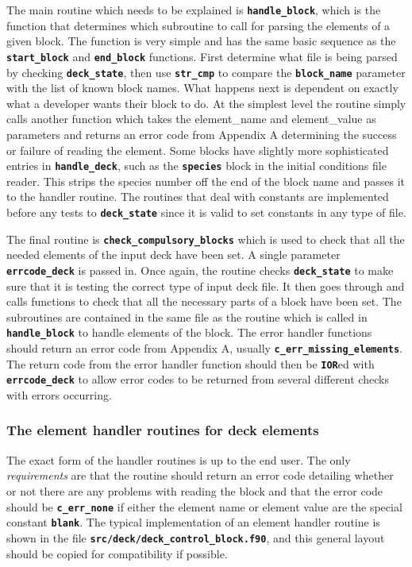 \documentclass[12pt,a4paper]{article}
\newcommand{\inlinecode}[1]{{\color{warwickred} \bf\texttt{#1}}}
\begin{document}
The main routine which needs to be explained is \inlinecode{handle\_block},
which is the function that determines which subroutine to call for parsing the
elements of a given block. The function is very simple and has the same basic
sequence as the \inlinecode{start\_block} and \inlinecode{end\_block}
functions. First determine what file is being parsed by checking
\inlinecode{deck\_state}, then use \inlinecode{str\_cmp} to compare the
\inlinecode{block\_name} parameter with the list of known block names. What
happens next is dependent on exactly what a developer wants their block to do.
At the simplest level the routine simply calls another function which
takes the element\_name and element\_value as
parameters and returns an error code from Appendix A determining the success or
failure of reading the element. Some blocks have slightly more sophisticated
entries in \inlinecode{handle\_deck}, such as the \inlinecode{species} block in
the initial conditions file reader. This strips the species number off the end
of the block name and passes it to the handler routine. The routines that deal
with constants are implemented before any tests to
\inlinecode{deck\_state} since it is valid to set constants in any
type of file.

The final routine is \inlinecode{check\_compulsory\_blocks} which is used to
check that all the needed elements of the input deck have been set. A single
parameter \inlinecode{errcode\_deck} is passed in. Once again, the routine
checks \inlinecode{deck\_state} to make sure that it is testing the correct
type of input deck file. It then goes through and calls functions to check that
all the necessary parts of a block have been set. The subroutines are contained
in the same file as the routine which is called in \inlinecode{handle\_block} to
handle elements of the block. The error handler functions should return an
error code from Appendix A, usually \inlinecode{c\_err\_missing\_elements}. The
return code from the error handler function should then be \inlinecode{IOR}ed
with \inlinecode{errcode\_deck} to allow error codes to be returned from
several different checks with errors occurring.

\subsubsection{The element handler routines for deck elements}
The exact form of the handler routines is up to the end user. The only {\it
requirements} are that the routine should return an error code detailing
whether or not there are any problems with reading the block and that the error
code should be \inlinecode{c\_err\_none} if either the element name or element
value are the special constant \inlinecode{blank}. The typical implementation
of an element handler routine is shown in the file
\inlinecode{src/deck/deck\_control\_block.f90}, and this general layout should
be copied for compatibility if possible.\\
\end{document}
